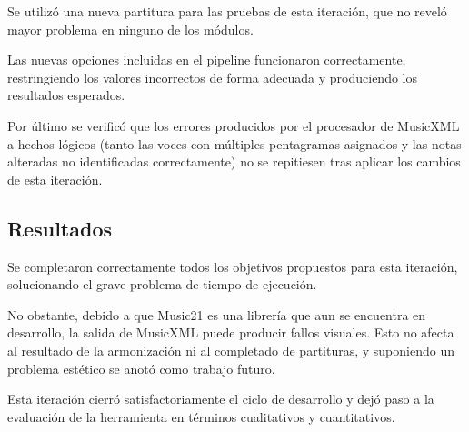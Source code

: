 Se utilizó una nueva partitura para las pruebas de esta iteración, que no reveló mayor problema en ninguno de los módulos.

Las nuevas opciones incluidas en el pipeline funcionaron correctamente, restringiendo los valores incorrectos de forma adecuada y produciendo los resultados esperados.

Por último se verificó que los errores producidos por el procesador de MusicXML a hechos lógicos (tanto las voces con múltiples pentagramas asignados y las notas alteradas no identificadas correctamente) no se repitiesen tras aplicar los cambios de esta iteración.

\subsection{Resultados}
\label{subsec:eighth_iteration_results}
Se completaron correctamente todos los objetivos propuestos para esta iteración, solucionando el grave problema de tiempo de ejecución.

No obstante, debido a que Music21 es una librería que aun se encuentra en desarrollo, la salida de MusicXML puede producir fallos visuales. Esto no afecta al resultado de la armonización ni al completado de partituras, y suponiendo un problema estético se anotó como trabajo futuro.

Esta iteración cierró satisfactoriamente el ciclo de desarrollo y dejó paso a la evaluación de la herramienta en términos cualitativos y cuantitativos.
